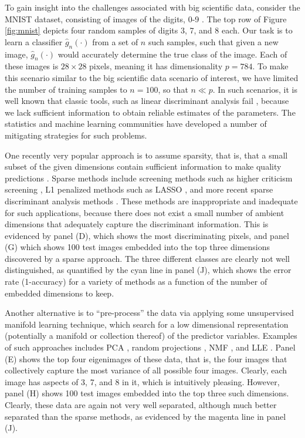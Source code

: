 \documentclass[10pt]{article}
\begin{document}
To gain insight into the challenges associated with big scientific data,  consider the MNIST dataset, consisting of images of the digits, 0-9 \cite{mnist}.  The top row of Figure \ref{fig:mnist} depicts four random samples of digits 3, 7, and 8 each. Our task is to learn a classifier $\hat{g}_n(\cdot)$ from a set of $n$ such samples, such that given a new image, $\hat{g}_n(\cdot)$ would accurately determine the true class of the image.  Each of these images is $28 \times 28$ pixels, meaning it has dimensionality $p=784$.  To make this scenario similar to the big scientific data scenario of interest, we have limited the number of training samples to $n=100$, so that $n \ll p$.  In such scenarios, it is well known that classic tools, such as linear discriminant analysis fail \cite{Bickel04a}, because we lack sufficient information to obtain reliable estimates of the parameters.  The statistics and machine learning communities have developed a number of mitigating strategies for such problems.  





One recently very popular approach is to assume sparsity, that is, that a small subset of the given dimensions contain sufficient information to make quality predictions \cite{Olshausen97a, Buhlmann14a}.  Sparse methods include screening methods such as higher criticism screening \cite{Donoho08a}, L1 penalized methods such as LASSO \cite{Tibs96}, and more recent sparse discriminant analysis methods \cite{Clemmensen2011,Mai12a,Fan2012}. These methods are inappropriate and inadequate for such applications, because there does not exist a small number of ambient dimensions that adequately capture the discriminant information.  This is evidenced by panel (D), which shows the most discriminating pixels, and panel (G) which shows 100 test images embedded into the top three dimensions discovered by a sparse approach. The three different classes are clearly not well distinguished, as quantified by the cyan line in panel (J), which shows the error rate (1-accuracy) for a variety of methods as a function of the number of embedded dimensions to keep.


Another alternative is to ``pre-process'' the data via applying some unsupervised manifold learning technique, which search for a low dimensional representation (potentially a manifold or collection thereof) of the predictor variables.  Examples of such approaches includes PCA \cite{Jolliffe2002}, random projections \cite{Candes06a}, NMF \cite{Paatero94a, LeeSeung99}, and LLE \cite{Roweis2000}.  Panel (E) shows the top four eigenimages of these data, that is, the four images that collectively capture the most variance of all possible four images.  Clearly, each image has aspects of 3, 7, and 8 in it, which is intuitively pleasing.  However, panel (H) shows 100 test images embedded into the top three such dimensions. Clearly, these data are again not very well separated, although much better separated than the sparse methods, as evidenced by the magenta line in panel (J).  
\end{document}
